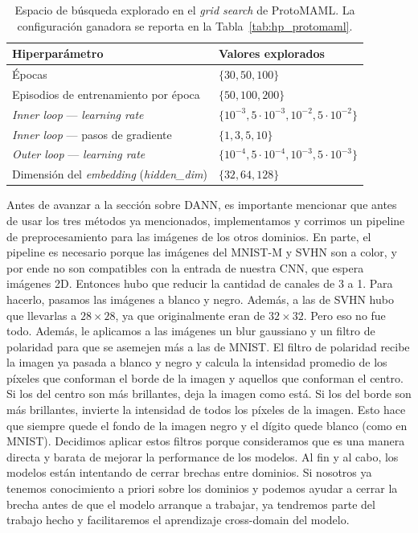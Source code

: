 \documentclass[12pt]{article}
\begin{document}
\begin{table}[H]
    \centering
    \begin{tabular}{ll}
        \hline
        Hiperparámetro                                   & Valores explorados \\
        \hline
        Épocas                                           & $\{30, 50, 100\}$ \\
        Episodios de entrenamiento por época             & $\{50, 100, 200\}$ \\
        \textit{Inner loop} — \textit{learning rate}     & $\{10^{-3}, 5 \cdot 10^{-3}, 10^{-2}, 5 \cdot 10^{-2}\}$ \\
        \textit{Inner loop} — pasos de gradiente         & $\{1, 3, 5, 10\}$ \\
        \textit{Outer loop} — \textit{learning rate}     & $\{10^{-4}, 5 \cdot 10^{-4}, 10^{-3}, 5 \cdot 10^{-3}\}$ \\
        Dimensión del \textit{embedding} (\textit{hidden\_dim}) & $\{32, 64, 128\}$ \\
        \hline
    \end{tabular}
    \caption{Espacio de búsqueda explorado en el \textit{grid search} de ProtoMAML. La configuración ganadora se reporta en la Tabla~\ref{tab:hp_protomaml}.}
    \label{tab:gs_protomaml}
\end{table}

Antes de avanzar a la sección sobre DANN, es importante mencionar que antes de usar los tres métodos ya mencionados, implementamos y corrimos un pipeline de preprocesamiento para las imágenes de los otros dominios. En parte, el pipeline es necesario porque las imágenes del MNIST-M y SVHN son a color, y por ende no son compatibles con la entrada de nuestra CNN, que espera imágenes 2D. Entonces hubo que reducir la cantidad de canales de 3 a 1. Para hacerlo, pasamos las imágenes a blanco y negro. Además, a las de SVHN hubo que llevarlas a $28\times28$, ya que originalmente eran de $32\times32$. Pero eso no fue todo. Además, le aplicamos a las imágenes un blur gaussiano y un filtro de polaridad para que se asemejen más a las de MNIST. El filtro de polaridad recibe la imagen ya pasada a blanco y negro y calcula la intensidad promedio de los píxeles que conforman el borde de la imagen y aquellos que conforman el centro. Si los del centro son más brillantes, deja la imagen como está. Si los del borde son más brillantes, invierte la intensidad de todos los píxeles de la imagen. Esto hace que siempre quede el fondo de la imagen negro y el dígito quede blanco (como en MNIST). Decidimos aplicar estos filtros porque consideramos que es una manera directa y barata de mejorar la performance de los modelos. Al fin y al cabo, los modelos están intentando de cerrar brechas entre dominios. Si nosotros ya tenemos conocimiento a priori sobre los dominios y podemos ayudar a cerrar la brecha antes de que el modelo arranque a trabajar, ya tendremos parte del trabajo hecho y facilitaremos el aprendizaje cross-domain del modelo.
\end{document}
